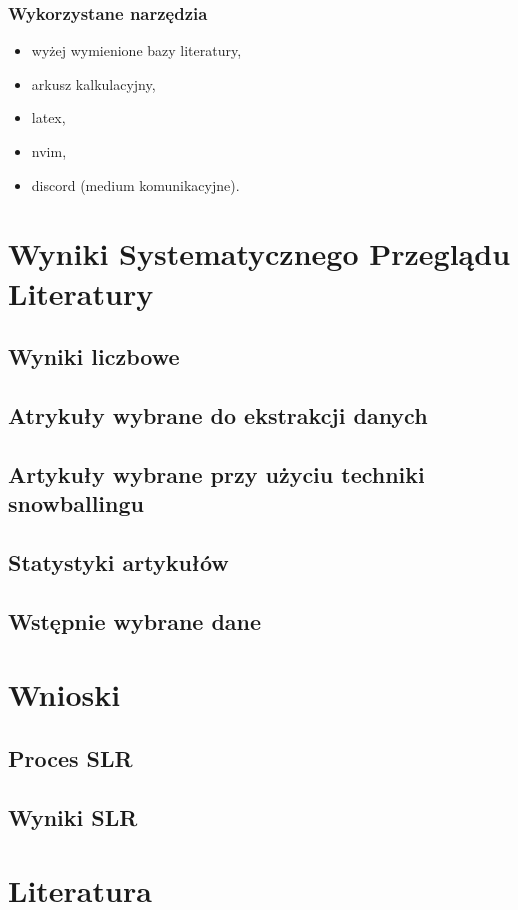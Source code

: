 \documentclass[polish,envcountsect,10pt]{article}
\begin{document}
\subsubsection{Wykorzystane narzędzia}

\begin{itemize}
	\item wyżej wymienione bazy literatury,
	\item arkusz kalkulacyjny,
	\item latex,
	\item nvim,
	\item discord (medium komunikacyjne).
\end{itemize}

\section{Wyniki Systematycznego Przeglądu Literatury}

\subsection{Wyniki liczbowe}

\subsection{Atrykuły wybrane do ekstrakcji danych}

\subsection{Artykuły wybrane przy użyciu techniki snowballingu}

\subsection{Statystyki artykułów}

\subsection{Wstępnie wybrane dane}

\section{Wnioski}

\subsection{Proces SLR}

\subsection{Wyniki SLR}

\section{Literatura}
\end{document}
